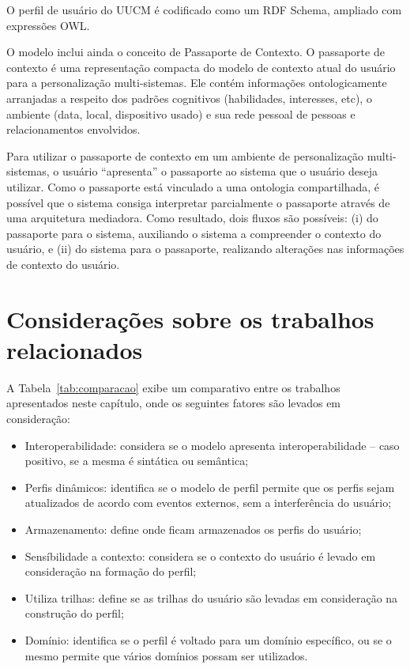 O perfil de usuário do UUCM é codificado como um RDF Schema\cite{rdf}, ampliado com expressões OWL.

O modelo inclui ainda o conceito de Passaporte de Contexto. O passaporte de contexto é uma representação compacta do modelo de contexto atual do usuário para a personalização multi-sistemas. Ele contém informações ontologicamente arranjadas a respeito dos padrões cognitivos (habilidades, interesses, etc), o ambiente (data, local, dispositivo usado) e sua rede pessoal de pessoas e relacionamentos envolvidos.

Para utilizar o passaporte de contexto em um ambiente de personalização multi-sistemas, o usuário ``apresenta'' o passaporte ao sistema que o usuário deseja utilizar. Como o passaporte está vinculado a uma ontologia compartilhada, é possível que o sistema consiga interpretar parcialmente o passaporte através de uma arquitetura mediadora. Como resultado, dois fluxos são possíveis: (i) do passaporte para o sistema, auxiliando o sistema a compreender o contexto do usuário, e (ii) do sistema para o passaporte, realizando alterações nas informações de contexto do usuário.


\section{Considerações sobre os trabalhos relacionados}

A Tabela~\ref{tab:comparacao} exibe um comparativo entre os trabalhos apresentados neste capítulo, onde os seguintes fatores são levados em consideração:

\begin{itemize}
  \item Interoperabilidade: considera se o modelo apresenta interoperabilidade -- caso positivo, se a mesma é sintática ou semântica;
  \item Perfis dinâmicos: identifica se o modelo de perfil permite que os perfis sejam atualizados de acordo com eventos externos, sem a interferência do usuário;
  \item Armazenamento: define onde ficam armazenados os perfis do usuário;
  \item Sensíbilidade a contexto: considera se o contexto do usuário é levado em consideração na formação do perfil;
  \item Utiliza trilhas: define se as trilhas do usuário são levadas em consideração na construção do perfil;
  \item Domínio: identifica se o perfil é voltado para um domínio específico, ou se o mesmo permite que vários domínios possam ser utilizados.
\end{itemize}

